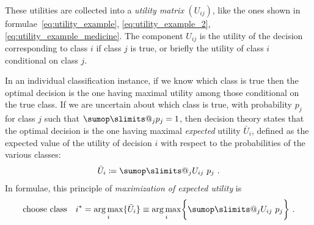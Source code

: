 \documentclass[\ifafour a4paper,12pt,\else a5paper,10pt,\fi%
onecolumn,oneside,article,%
british%
]{memoir}
\makeatletter
\theoremstyle{remark}
\theoremstyle{innote}
\def\sum{\DOTSI\sumop\slimits@}
\newcommand*{\mathte}[1]{\textbf{\textit{\textsf{#1}}}}
\newcommand*{\defd}{\coloneqq}
\DeclarePairedDelimiter\set{\{}{\}} %
\newcommand*{\p}{\mathrm{p}}%
\renewcommand*{\|}[1][]{\nonscript\:#1\vert\nonscript\:\mathopen{}}
\DeclareMathOperator*{\argmax}{arg\,max}
\newcommand*{\U}{\mathrm{u}}
\newcommand*{\eu}{\bar{U}}
\newcommand*{\nd}{n_{\textrm{d}}}
\newcommand*{\nc}{n_{\textrm{c}}}
\makeatother
\begin{document}
These utilities are collected into a \emph{utility matrix} $(U_{ij})$, like the ones shown in formulae~\eqref{eq:utility_example}, \eqref{eq:utility_example_2}, \eqref{eq:utility_example_medicine}.
The component $U_{ij}$ is the utility of the decision corresponding to class $i$ if class $j$ is true, or briefly the utility of class $i$ conditional on class $j$.

In an individual classification instance, if we know which class is true then the optimal decision is the one having maximal utility among those conditional on the true class. If we are uncertain about which class is true, with probability $p_{j}$ for class $j$ such that $\sum_{j}p_{j}=1$, then decision theory states that the optimal decision is the one having maximal \emph{expected} utility $\eu_{i}$, defined as the expected value of the utility of decision $i$ with respect to the probabilities of the various classes:
\begin{equation}
  \label{eq:exp_utility}
  \eu_{i} \defd \sum_{j} U_{ij}\ p_{j} \ .
\end{equation}
In formulae, this principle of \emph{maximization of expected utility}  is
\begin{equation}
  \label{eq:max_expe_utility}
  \text{choose class}\quad
  i^{*} = \argmax_{i}\set{\eu_{i}} \equiv \argmax_{i}\set[\bigg]{\sum_{j} U_{ij}\ p_{j}} \ .
\end{equation}
\end{document}
